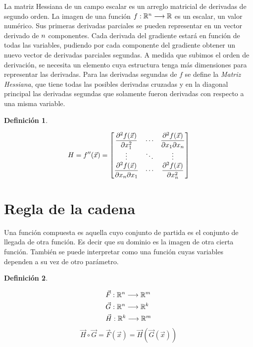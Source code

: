\documentclass[a5paper,12pt,twoside]{book}
\newtheorem{defn}{{Definición}}[chapter]
\begin{document}
La matriz Hessiana de un campo escalar es un arreglo matricial de derivadas de segundo orden. La imagen de una función $f:\mathbb{R}^n \longrightarrow \mathbb{R}$ es un escalar, un valor numérico. Sus primeras derivadas parciales se pueden representar en un vector derivado de $n$ componentes. Cada derivada del gradiente estará en función de todas las variables, pudiendo por cada componente del gradiente obtener un nuevo vector de derivadas parciales segundas. A medida que subimos el orden de derivación, se necesita un elemento cuya estructura tenga más dimensiones para representar las derivadas. Para las derivadas segundas de $f$ se define la \emph{Matriz Hessiana}, que tiene todas las posibles derivadas cruzadas y en la diagonal principal las derivadas segundas que solamente fueron derivadas con respecto a una misma variable.

\begin{mdframed}[style=MyFrame1]
    \begin{defn}
    \end{defn}
    \begin{equation*}
        H = f''(\Vec{x}) =
        \begin{bmatrix}
            \dfrac{\partial^2 f(\Vec{x})}{\partial x_1^2} & \cdots & \dfrac{\partial^2 f(\Vec{x})}{\partial x_1 \partial x_n}
            \\
            \vdots & \ddots & \vdots
            \\
            \dfrac{\partial^2 f(\Vec{x})}{\partial x_n \partial x_1} & \cdots & \dfrac{\partial^2 f(\Vec{x})}{\partial x_n^2}
        \end{bmatrix}
    \end{equation*}
\end{mdframed}


\section{Regla de la cadena}

Una función compuesta es aquella cuyo conjunto de partida es el conjunto de llegada de otra función. Es decir que su dominio es la imagen de otra cierta función. También se puede interpretar como una función cuyas variables dependen a su vez de otro parámetro.
\clearpage
\begin{mdframed}[style=MyFrame1]
    \begin{defn}
    \end{defn}
    \begin{align*}
        & \Vec{F}:\mathbb{R}^n \longrightarrow \mathbb{R}^m
        \\
        & \Vec{G}:\mathbb{R}^n \longrightarrow \mathbb{R}^k
        \\
        & \Vec{H}:\mathbb{R}^k \longrightarrow \mathbb{R}^m
    \end{align*}
    \begin{equation*}
        \Vec{H} \circ \Vec{G} = \Vec{F}(\Vec{x})=\Vec{H} \left( \Vec{G}(\Vec{x}) \right)
    \end{equation*}
\end{mdframed}
\end{document}
